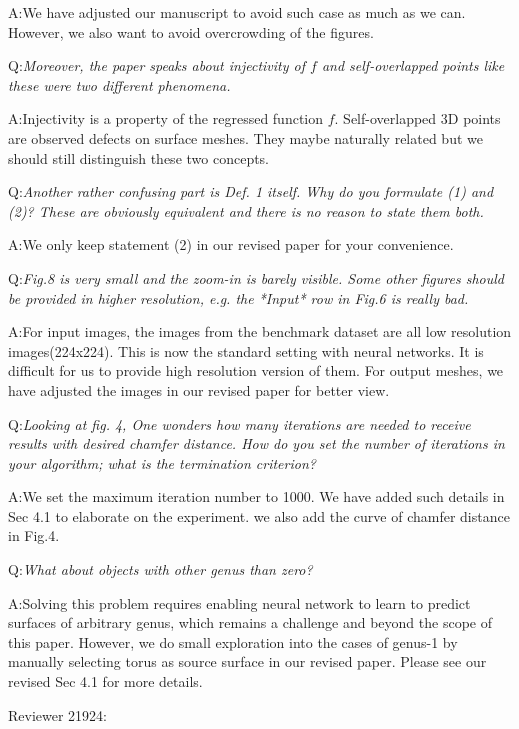 \documentclass[10pt]{letter} %
\begin{document}
	A:We have adjusted our manuscript to avoid such case as much as we can. However, we also want to avoid overcrowding of the figures.
	
	Q:\emph{Moreover, the paper speaks about injectivity of $f$ and self-overlapped points like these were two different phenomena.}
	
	A:Injectivity is a property of the regressed function $f$. Self-overlapped 3D points are observed defects on surface meshes. They maybe naturally related but we should still distinguish these two concepts.
	
	Q:\emph{Another rather confusing part is Def. 1 itself. Why do you formulate (1) and (2)? These are obviously equivalent and there is no reason to state them both.}
	
	A:We only keep statement (2) in our revised paper for your convenience.
	
	Q:\emph{Fig.8 is very small and the zoom-in is barely visible.  Some other figures should be provided in higher resolution, e.g. the *Input* row in Fig.6 is really bad.} 
	
	A:For input images, the images from the benchmark dataset are all low resolution images(224x224). This is now the standard setting with neural networks. It is difficult for us to provide high resolution version of them. For output meshes, we have adjusted the images in our revised paper for better view.
	
	Q:\emph{Looking at fig. 4, One wonders how many iterations are needed to receive results with desired chamfer distance. How do you set the number of iterations in your algorithm; what is the termination criterion?}
	
	A:We set the maximum iteration number to 1000. We have added such details in Sec 4.1 to elaborate on the experiment. we also add the curve of chamfer distance in Fig.4. 
	
	Q:\emph{What about objects with other genus than zero?}
	
	A:Solving this problem requires enabling neural network to learn to predict surfaces of arbitrary genus, which remains a challenge and beyond the scope of this paper. However, we do small exploration into the cases of genus-1 by manually selecting torus as source surface in our revised paper. Please see our revised Sec 4.1 for more details.
	
	\hdashrule{\linewidth}{1pt}{1mm}
	Reviewer 21924:\\
	
\end{document}

